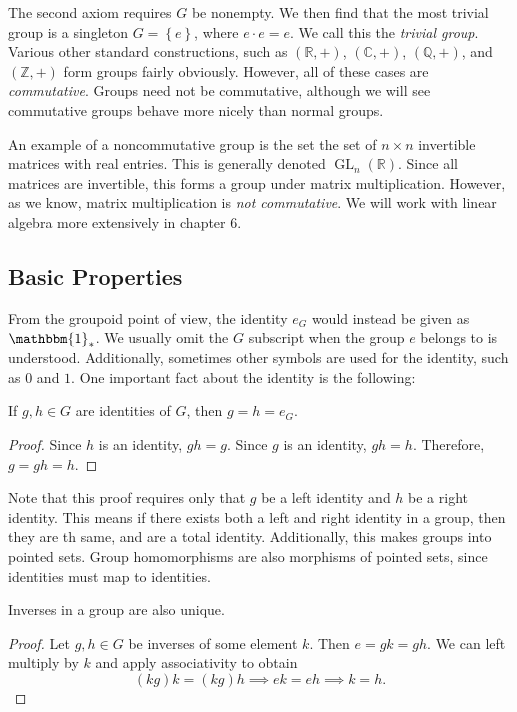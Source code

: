 The second axiom requires $G$ be nonempty. We then find that the most trivial group is a singleton $G=\left\{ e \right\} $, where $e\cdot e=e$. We call this the \emph{trivial group}. Various other standard constructions, such as $(\mathbb{R},+)$, $(\mathbb{C},+)$, $(\mathbb{Q},+)$, and $(\mathbb{Z},+)$ form groups fairly obviously. However, all of these cases are \emph{commutative}. Groups need not be commutative, although we will see commutative groups behave more nicely than normal groups.

An example of a noncommutative group is the set the set of $n\times n$ invertible matrices with real entries. This is generally denoted  $\operatorname{GL}_n(\mathbb{R}) $. Since all matrices are invertible, this forms a group under matrix multiplication. However, as we know, matrix multiplication is \emph{not commutative}. We will work with linear algebra more extensively in chapter 6.

\subsection{Basic Properties}

From the groupoid point of view, the identity $e_G$ would instead be given as $\mathbbm{1}_{*} $. We usually omit the $G$ subscript when the group $e$ belongs to is understood. Additionally, sometimes other symbols are used for the identity, such as $0$ and $1$. One important fact about the identity is the following:
\begin{proposition}\label{prp:2.1.1}
	If $g,h\in G$ are identities of $G$, then $g=h=e_G$.
\end{proposition}
\begin{proof}
	Since $h$ is an identity, $gh=g$. Since $g$ is an identity, $gh=h$. Therefore, $g=gh=h$.
\end{proof}
Note that this proof requires only that $g$ be a left identity and $h$ be a right identity. This means if there exists both a left and right identity in a group, then they are th same, and are a total identity. Additionally, this makes groups into pointed sets. Group homomorphisms are also morphisms of pointed sets, since identities must map to identities.
\begin{proposition}\label{prp:2.1.2}
	Inverses in a group are also unique.
\end{proposition}
\begin{proof}
	Let $g,h\in G$ be inverses of some element $k$. Then $e=gk=gh$. We can left multiply by $k$ and apply associativity to obtain
	\[
		(kg)k=(kg)h\implies ek=eh\implies k=h
	.\]
\end{proof}


